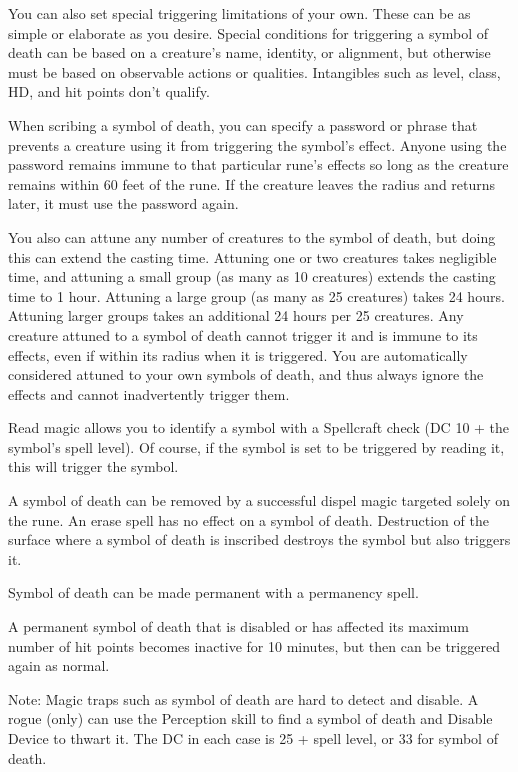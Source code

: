 {You can also set special triggering limitations of your own. These can be as simple or elaborate as you desire. Special conditions for triggering a symbol of death can be based on a creature's name, identity, or alignment, but otherwise must be based on observable actions or qualities. Intangibles such as level, class, HD, and hit points don't qualify.

When scribing a symbol of death, you can specify a password or phrase that prevents a creature using it from triggering the symbol's effect. Anyone using the password remains immune to that particular rune's effects so long as the creature remains within 60 feet of the rune. If the creature leaves the radius and returns later, it must use the password again.

You also can attune any number of creatures to the symbol of death, but doing this can extend the casting time. Attuning one or two creatures takes negligible time, and attuning a small group (as many as 10 creatures) extends the casting time to 1 hour. Attuning a large group (as many as 25 creatures) takes 24 hours. Attuning larger groups takes an additional 24 hours per 25 creatures. Any creature attuned to a symbol of death cannot trigger it and is immune to its effects, even if within its radius when it is triggered. You are automatically considered attuned to your own symbols of death, and thus always ignore the effects and cannot inadvertently trigger them.

Read magic allows you to identify a symbol with a Spellcraft check (DC 10 + the symbol's spell level). Of course, if the symbol is set to be triggered by reading it, this will trigger the symbol.

A symbol of death can be removed by a successful dispel magic targeted solely on the rune. An erase spell has no effect on a symbol of death. Destruction of the surface where a symbol of death is inscribed destroys the symbol but also triggers it.

Symbol of death can be made permanent with a permanency spell.

A permanent symbol of death that is disabled or has affected its maximum number of hit points becomes inactive for 10 minutes, but then can be triggered again as normal.

Note: Magic traps such as symbol of death are hard to detect and disable. A rogue (only) can use the Perception skill to find a symbol of death and Disable Device to thwart it. The DC in each case is 25 + spell level, or 33 for symbol of death.}
        
